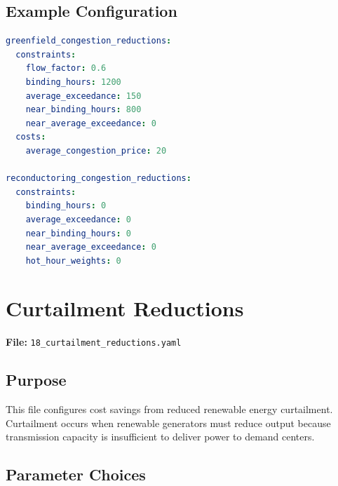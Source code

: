 \documentclass[ctcc_full_documentation.tex]{subfiles}
\begin{document}
\subsection{Example Configuration}

\begin{lstlisting}[language=yaml]
greenfield_congestion_reductions:
  constraints:
    flow_factor: 0.6
    binding_hours: 1200
    average_exceedance: 150
    near_binding_hours: 800
    near_average_exceedance: 0
  costs:
    average_congestion_price: 20

reconductoring_congestion_reductions:
  constraints:
    binding_hours: 0
    average_exceedance: 0
    near_binding_hours: 0
    near_average_exceedance: 0
    hot_hour_weights: 0
\end{lstlisting}

\section{Curtailment Reductions}
\label{sec:curtailment}

\textbf{File:} \texttt{18\_curtailment\_reductions.yaml}

\subsection{Purpose}

This file configures cost savings from reduced renewable energy curtailment. Curtailment occurs when renewable generators must reduce output because transmission capacity is insufficient to deliver power to demand centers.

\subsection{Parameter Choices}
\end{document}
